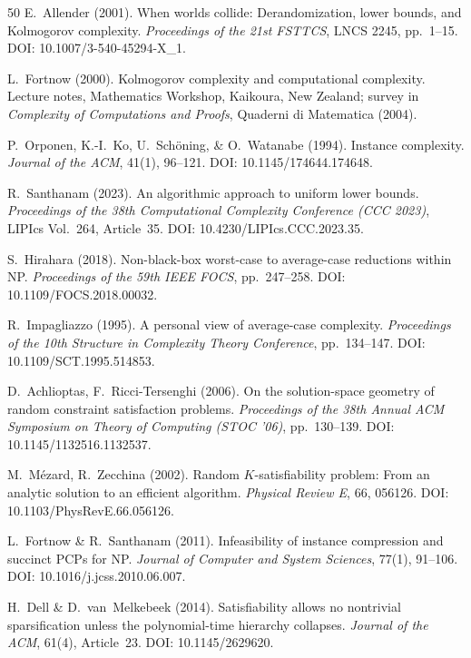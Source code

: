\documentclass[aps,prd,twocolumn,superscriptaddress,nofootinbib]{revtex4-2}
\theoremstyle{definition}
\theoremstyle{remark}
\begin{document}
\begin{thebibliography}{50}
E.~Allender (2001).
When worlds collide: Derandomization, lower bounds, and Kolmogorov complexity.
\textit{Proceedings of the 21st FSTTCS}, LNCS 2245, pp.\ 1--15.
DOI: 10.1007/3-540-45294-X\_1.

L.~Fortnow (2000).
Kolmogorov complexity and computational complexity.
Lecture notes, Mathematics Workshop, Kaikoura, New Zealand; survey in \textit{Complexity of Computations and Proofs}, Quaderni di Matematica (2004).

P.~Orponen, K.-I.~Ko, U.~Schöning, \& O.~Watanabe (1994).
Instance complexity.
\textit{Journal of the ACM}, 41(1), 96--121.
DOI: 10.1145/174644.174648.

R.~Santhanam (2023).
An algorithmic approach to uniform lower bounds.
\textit{Proceedings of the 38th Computational Complexity Conference (CCC 2023)}, LIPIcs Vol.\ 264, Article~35.
DOI: 10.4230/LIPIcs.CCC.2023.35.

S.~Hirahara (2018).
Non-black-box worst-case to average-case reductions within NP.
\textit{Proceedings of the 59th IEEE FOCS}, pp.\ 247--258.
DOI: 10.1109/FOCS.2018.00032.

R.~Impagliazzo (1995).
A personal view of average-case complexity.
\textit{Proceedings of the 10th Structure in Complexity Theory Conference}, pp.\ 134--147.
DOI: 10.1109/SCT.1995.514853.

D.~Achlioptas, F.~Ricci-Tersenghi (2006).
On the solution-space geometry of random constraint satisfaction problems.
\textit{Proceedings of the 38th Annual ACM Symposium on Theory of Computing (STOC '06)}, pp.\ 130--139.
DOI: 10.1145/1132516.1132537.

M.~M\'ezard, R.~Zecchina (2002).
Random $K$-satisfiability problem: From an analytic solution to an efficient algorithm.
\textit{Physical Review E}, 66, 056126.
DOI: 10.1103/PhysRevE.66.056126.

L.~Fortnow \& R.~Santhanam (2011).
Infeasibility of instance compression and succinct PCPs for NP.
\textit{Journal of Computer and System Sciences}, 77(1), 91--106.
DOI: 10.1016/j.jcss.2010.06.007.

H.~Dell \& D.~van~Melkebeek (2014).
Satisfiability allows no nontrivial sparsification unless the polynomial-time hierarchy collapses.
\textit{Journal of the ACM}, 61(4), Article~23.
DOI: 10.1145/2629620.


\end{thebibliography}
\end{document}
